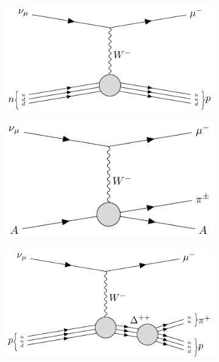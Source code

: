 \begin{figure}[t]
	\begin{subfigure}{0.5\textwidth}
		\centering
		\includegraphics[width=.90\linewidth]{Images/Nu/feynman_ccqel.pdf}
	\end{subfigure}
	\begin{subfigure}{0.5\textwidth}
		\centering
		\includegraphics[width=.90\linewidth]{Images//Nu/feynman_ccmec.pdf}
	\end{subfigure}
	\begin{subfigure}{0.5\textwidth}
		\centering
		\includegraphics[width=.90\linewidth]{Images//Nu/feynman_ccres.pdf}
	\end{subfigure}
	\begin{subfigure}{0.5\textwidth}

\end{subfigure}
\end{figure}

